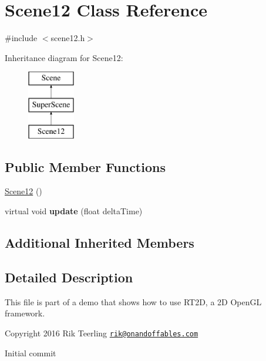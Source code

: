 \hypertarget{class_scene12}{}\section{Scene12 Class Reference}
\label{class_scene12}


{\ttfamily \#include $<$scene12.\+h$>$}

Inheritance diagram for Scene12\+:\begin{figure}[H]
\begin{center}
\leavevmode
\includegraphics[height=3.000000cm]{class_scene12}
\end{center}
\end{figure}
\subsection*{Public Member Functions}
\begin{DoxyCompactItemize}
\item 
\hyperlink{class_scene12_aa060f8a7b4560c810120a82ebebfee3d}{Scene12} ()
\item 
\mbox{\label{class_scene12_aac1be6b461b9290a457b528056fd8263}} 
virtual void {\bfseries update} (float delta\+Time)
\end{DoxyCompactItemize}
\subsection*{Additional Inherited Members}


\subsection{Detailed Description}
This file is part of a demo that shows how to use R\+T2D, a 2D Open\+GL framework.


\begin{DoxyItemize}
\item Copyright 2016 Rik Teerling \href{mailto:rik@onandoffables.com}{\tt rik@onandoffables.\+com}
\begin{DoxyItemize}
\item Initial commit 
\end{DoxyItemize}
\end{DoxyItemize}

